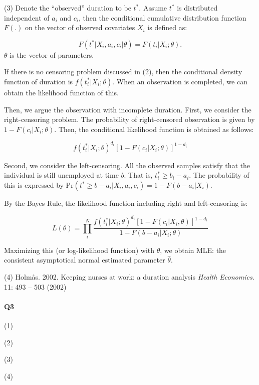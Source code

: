 \documentclass[dvipdfmx, 12pt]{article}
\begin{document}
\vspace{1zw}
(3) Denote the ``observed'' duration to be $t^*$. Assume $t^*$ is distributed independent of $a_i$ and $c_i$, then the conditional cumulative distribution function $F(.)$ on the vector of observed covariates $X_i$ is defined as:

\[
F(t^* | X_i, a_i, c_i | \theta) = F(t_i | X_i; \theta).
\]
$\theta$ is the vector of parameters.

If there is no censoring problem discussed in (2), then the conditional density function of duration is $f(t^*_i | X_i; \theta)$. When an observation is completed, we can obtain the likelihood function of this.

Then, we argue the observation with incomplete duration. First, we consider the right-censoring problem. The probability of  right-censored observation is given by $1 - F(c_i | X_i; \theta)$. Then, the conditional likelihood function is obtained as follows:

\[
f(t_i^* | X_i; \theta)^{d_i} [1 - F(c_i | X_i; \theta)]^{1 - d_i}
\]

Second, we consider the left-censoring. All the observed samples satisfy that the individual is still unemployed at time $b$. That is, $t^*_i \geq b_i - a_i$. The probability of this is expressed by $\text{Pr}(t^* \geq b - a_i | X_i, a_i, c_i) = 1 - F(b - a_i | X_i)$.

By the Bayes Rule, the likelihood function including right and left-censoring is:

\[
L(\theta) = \prod_i^N \dfrac{f(t^*_i | X_i; \theta)^{d_i} [1 - F (c_i | X_i, \theta)]^{1 - d_i}}{1 - F(b - a_i | X_i; \theta)}
\]

Maximizing this (or log-likelihood function) with $\theta$, we obtain MLE: the consistent asymptotical normal estimated parameter $\hat{\theta}$.

\vspace{1zw}
(4) Holm\r{a}s. 2002. Keeping nurses at work: a duration analysis \textit{Health Economics}. 11: 493 -- 503 (2002)



\paragraph{Q3} \hspace{1zw}

(1)

\vspace{1zw}
(2)

\vspace{1zw}
(3)

\vspace{1zw}
(4)
\end{document}
